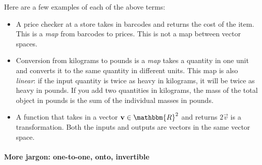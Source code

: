 \documentclass[12pt, oneside]{report}    %
\begin{document}
\begin{example}
Here are a few examples of each of the above terms:
\begin{itemize}
    \item A price checker at a store takes in barcodes and returns the cost of the item. This is a \emph{map} from barcodes to prices. This is not a map between vector spaces.\sidenotemark
    \item Conversion from kilograms to pounds is a \emph{map} takes a quantity in one unit and converts it to the same quantity in different units. This map is also \emph{linear}: if the input quantity is twice as heavy in kilograms, it will be twice as heavy in pounds. If you add two quantities in kilograms, the mass of the total object in pounds is the sum of the individual masses in pounds.
    \item A function that takes in a vector $\vec{v}\in\mathbbm{R}^2$ and returns $2\vec{v}$ is a transformation. Both the inputs and outputs are vectors in the same vector space. 
\end{itemize}
\end{example}

\paragraph{More jargon: one-to-one, onto, invertible}
\end{document}
